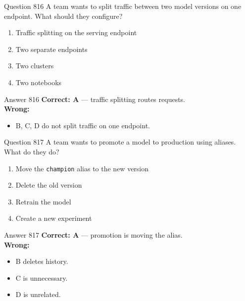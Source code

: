 \documentclass[aspectratio=169,11pt]{beamer}
\begin{document}
	\begin{frame}{Question 816}
		A team wants to split traffic between two model versions on one endpoint. What should they configure?
		\begin{enumerate}[label=\Alph*.]
			\item Traffic splitting on the serving endpoint
			\item Two separate endpoints
			\item Two clusters
			\item Two notebooks
		\end{enumerate}
	\end{frame}
	\begin{frame}{Answer 816}
		\textbf{Correct: A} --- traffic splitting routes requests.\\
		\vspace{0.5em}
		\textbf{Wrong:}
		\begin{itemize}
			\item B, C, D do not split traffic on one endpoint.
		\end{itemize}
	\end{frame}
	
	\begin{frame}{Question 817}
		A team wants to promote a model to production using aliases. What do they do?
		\begin{enumerate}[label=\Alph*.]
			\item Move the \texttt{champion} alias to the new version
			\item Delete the old version
			\item Retrain the model
			\item Create a new experiment
		\end{enumerate}
	\end{frame}
	\begin{frame}{Answer 817}
		\textbf{Correct: A} --- promotion is moving the alias.\\
		\vspace{0.5em}
		\textbf{Wrong:}
		\begin{itemize}
			\item B deletes history.
			\item C is unnecessary.
			\item D is unrelated.
		\end{itemize}
	\end{frame}
	
\end{document}

